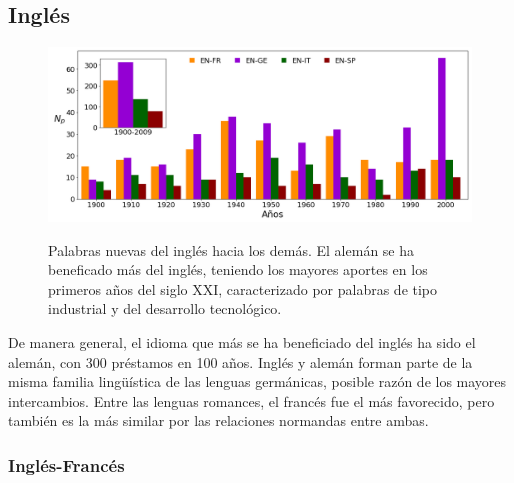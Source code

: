 	



\clearpage

\subsection{Inglés}

\begin{figure}[h!]
	\centering
	\includegraphics[scale=.38]{Cap_3/NC_EN.png}
	\label{fig.NC_EN}
	\caption{Palabras nuevas del inglés hacia los demás. El alemán se ha beneficado más del inglés, teniendo los mayores aportes en los primeros años del siglo XXI, caracterizado por palabras de tipo industrial y del desarrollo tecnológico.}
\end{figure} %



De manera general, el idioma que más se ha beneficiado del inglés ha sido el
alemán, con 300 préstamos en 100 años.  Inglés y alemán forman parte de la
misma familia lingüística de las lenguas germánicas,  posible razón de los
mayores intercambios. Entre las lenguas romances, el francés fue el más
favorecido, pero también es la más similar por las relaciones normandas entre
ambas.
\subsubsection*{Inglés-Francés} %

